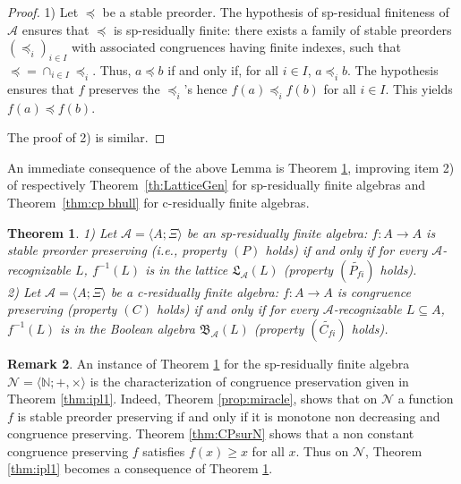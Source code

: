 \documentclass[11pt,a4paper]{article}
\newtheorem{theorem}{Theorem}[section]
\theoremstyle{definition} %
\newtheorem{remark}[theorem]{Remark}
\newcommand\+[1]{\mathcal{#1}} %
\newcommand{\N}{{\mathbb N}}     %
\newcommand{\Bool}{{\mathfrak{B}}}   %
\newcommand{\Latt}{{\mathfrak{L}}}
\begin{document}
\begin{proof}
1) Let $\preceq$ be a stable preorder. 
The  hypothesis of sp-residual finiteness of $\+A$ ensures that $\preceq$ is sp-residually  finite:
there exists a family of stable preorders $(\preceq_i)_{i\in I}$  
with associated congruences having finite indexes, such that ${\preceq}={\cap_{i\in I} \preceq_i}$.
Thus, $a\preceq b$ if and only if, for all $i\in I$, $a\preceq_i b$.  
The hypothesis ensures that $f$ preserves the $\preceq_i$'s hence 
$f(a)\preceq_i f(b)$ for all $i\in I$. This yields $f(a)\preceq f(b)$.

The proof of 2) is similar.
\end{proof}
%
  An immediate consequence of the above Lemma is  Theorem \ref{th:RecLatGeneralResiduallyFinite},   improving  item 2)  of respectively Theorem~\ref{th:LatticeGen} for 
sp-residually finite algebras and Theorem~\ref{thm:cp bhull} for 
c-residually finite algebras.

\begin{theorem}\label{th:RecLatGeneralResiduallyFinite} 
1) Let $\+A = \langle A;\Xi\rangle$ be an  sp-residually finite algebra:
$f\colon  A\to A$ is stable preorder preserving (i.e.,  property $(P)$ holds) if and only if  for every $\+A$-recognizable $L$, $f^{-1}(L)$ is in the lattice $\Latt_{\+A}(L)$ (property $(\widetilde{P_{\textit{fi}}})$ holds). \\
2) Let $\+A = \langle A;\Xi\rangle$ be  a c-residually finite algebra:
 $f\colon  A\to A$ is  congruence preserving (property $(C)$ holds) if and only if for every $\+A$-recognizable $L\subseteq A$,
$ f^{-1}(L)$ is in the Boolean algebra $\Bool_{\+A}(L)$   (property $(\widetilde{C_{\textit{fi}}})$ holds).
\end{theorem}

\begin{remark} %
An instance of Theorem \ref{th:RecLatGeneralResiduallyFinite} for the sp-residually finite algebra $\+N=\langle \N ;  +, \times\rangle$
is the characterization of congruence preservation given in Theorem \ref{thm:ipl1}. 
Indeed, Theorem \ref{prop:miracle}, 
shows that on $\+N$ a function $f$ is stable preorder preserving 
if and only if it is monotone non  decreasing and congruence preserving.  Theorem \ref{thm:CPsurN} shows that a
 non constant congruence preserving $f$ satisfies $f(x)\geq x$ for all $x$.  Thus on $\+N$, Theorem \ref{thm:ipl1}  becomes a consequence of Theorem \ref{th:RecLatGeneralResiduallyFinite}.
\end{remark}
\end{document}
